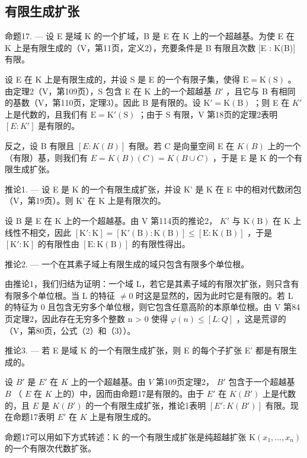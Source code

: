 \subsection{有限生成扩张}

命题17. --- 设 E 是域 K 的一个扩域，B 是 E 在 K 上的一个超越基。为使 E 在 K 上是有限生成的（V，第11页，定义2），充要条件是 B 有限且次数 {[}E : K(B){]} 有限。

设 E 在 K 上是有限生成的，并设 S 是 E 的一个有限子集，使得 \(\mathrm{E} = \mathrm{K}(\mathrm{S})\) 。由定理2（V，第109页），S 包含 E 在 K 上的一个超越基 \(B'\) ，且它与 B 有相同的基数（V，第110页，定理3）。因此 B 是有限的。设 \(\mathrm{K}' = \mathrm{K}(\mathrm{B})\) ；则 E 在 \(K'\) 上是代数的，且我们有 \(\mathrm{E} = \mathrm{K}'(\mathrm{S})\) ；由于 S 有限，V 第18页的定理2表明 \([E : K']\) 是有限的。

反之，设 B 有限且 \([E:K(B)]\) 有限。若 C 是向量空间 E 在 \(K(B)\) 上的一个（有限）基，则我们有 \(E = K(B)(C) = K(B \cup C)\) ，于是 E 是 K 的一个有限生成扩张。

推论1. --- 设 E 是 K 的一个有限生成扩张，并设 K' 是 K 在 E 中的相对代数闭包（V，第19页）。则 K' 在 K 上是有限次的。

设 B 是 E 在 K 上的一个超越基。由 V 第114页的推论2， \(K'\) 与 \(\mathrm{K}(\mathrm{B})\) 在 K 上线性不相交，因此 \([\mathrm{K}' : \mathrm{K}] = [\mathrm{K}'(\mathrm{B}) : \mathrm{K}(\mathrm{B})] \leq [\mathrm{E} : \mathrm{K}(\mathrm{B})]\) ，于是 \([\mathrm{K}' : \mathrm{K}]\) 的有限性由 \([\mathrm{E} : \mathrm{K}(\mathrm{B})]\) 的有限性得出。

推论2. --- 一个在其素子域上有限生成的域只包含有限多个单位根。

由推论1，我们归结为证明：一个域 L，若它是其素子域的有限次扩张，则只含有有限多个单位根。当 L 的特征 \(\neq0\) 时这是显然的，因为此时它是有限的。若 L 的特征为 0 且包含无穷多个单位根，则它包含任意高阶的本原单位根。由 V 第84页定理2，因此存在无穷多个整数 n \textgreater{} 0 使得 \(\varphi(n) \leqslant [L : Q]\) ，这是荒谬的（V，第80页，公式（2）和（3））。

推论3. --- 若 E 是域 K 的一个有限生成扩张，则 E 的每个子扩张 E' 都是有限生成的。

设 \(B'\) 是 \(E'\) 在 \(K\) 上的一个超越基。由 \(V\) 第109页定理2， \(B'\) 包含于一个超越基 \(B\) （ \(E\) 在 \(K\) 上的）中，因而由命题17是有限的。由于 \(E'\) 在 \(K(B')\) 上是代数的，且 \(E\) 是 \(K(B')\) 的一个有限生成扩张，推论1表明 \([E': K(B')]\) 有限。现在命题17表明 \(E'\) 在 \(K\) 上是有限生成的。

命题17可以用如下方式转述：K 的一个有限生成扩张是纯超越扩张 \(\mathrm{K}(x_{1},\ldots,x_{n})\) 的一个有限次代数扩张。

